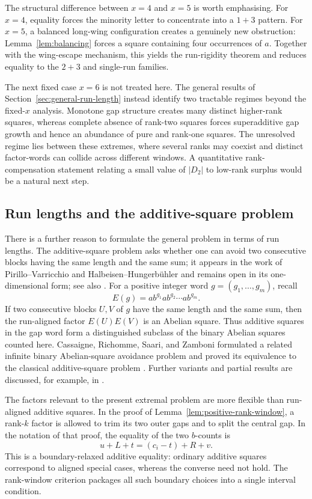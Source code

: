 \documentclass[11pt]{article}
\theoremstyle{definition}
\begin{document}
The structural difference between $x=4$ and $x=5$ is worth emphasising. For $x=4$, equality forces the minority letter to concentrate into a $1+3$ pattern. For $x=5$, a balanced long-wing configuration creates a genuinely new obstruction: Lemma~\ref{lem:balancing} forces a square containing four occurrences of $a$. Together with the wing-escape mechanism, this yields the run-rigidity theorem and reduces equality to the $2+3$ and single-run families.

The next fixed case $x=6$ is not treated here.  The general results of Section~\ref{sec:general-run-length} instead identify two tractable regimes beyond the fixed-$x$ analysis.  Monotone gap structure creates many distinct higher-rank squares, whereas complete absence of rank-two squares forces superadditive gap growth and hence an abundance of pure and rank-one squares.  The unresolved regime lies between these extremes, where several ranks may coexist and distinct factor-words can collide across different windows.  A quantitative rank-compensation statement relating a small value of $|D_2|$ to low-rank surplus would be a natural next step.

\subsection*{Run lengths and the additive-square problem}
There is a further reason to formulate the general problem in terms of run lengths.  The additive-square problem asks whether one can avoid two consecutive blocks having the same length and the same sum; it appears in the work of Pirillo--Varricchio and Halbeisen--Hungerb\"uhler \cite{PirilloVarricchio1994,HalbeisenHungerbuhler2000} and remains open in its one-dimensional form; see also \cite{RaoRosenfeld2018}.  For a positive integer word $g=(g_1,\ldots,g_m)$, recall
\[
 E(g)=ab^{g_1}ab^{g_2}\cdots ab^{g_m}.
\]
If two consecutive blocks $U,V$ of $g$ have the same length and the same sum, then the run-aligned factor $E(U)E(V)$ is an Abelian square.  Thus additive squares in the gap word form a distinguished subclass of the binary Abelian squares counted here.  Cassaigne, Richomme, Saari, and Zamboni formulated a related infinite binary Abelian-square avoidance problem and proved its equivalence to the classical additive-square problem \cite{CassaigneRichommeSaariZamboni2011}.  Further variants and partial results are discussed, for example, in \cite{BrownJungicPoelstra2014,RaoRosenfeld2018,Vukusic2026}.

The factors relevant to the present extremal problem are more flexible than run-aligned additive squares.  In the proof of Lemma~\ref{lem:positive-rank-window}, a rank-$k$ factor is allowed to trim its two outer gaps and to split the central gap.  In the notation of that proof, the equality of the two $b$-counts is
\[
 u+L+t=(c_i-t)+R+v.
\]
This is a boundary-relaxed additive equality: ordinary additive squares correspond to aligned special cases, whereas the converse need not hold.  The rank-window criterion packages all such boundary choices into a single interval condition.
\end{document}
